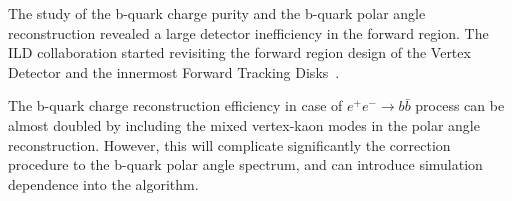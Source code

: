 The study of the b-quark charge purity and the b-quark polar angle reconstruction revealed a large detector inefficiency in the forward region. The ILD collaboration started revisiting the forward region design of the Vertex Detector and the innermost Forward Tracking Disks~\cite{bib:ILDNEW}. 

The b-quark charge reconstruction efficiency in case of $e^+e^-\to b\bar{b}$ process can be almost doubled by including the mixed vertex-kaon modes in the polar angle reconstruction. 
However, this will complicate significantly the correction procedure to the b-quark polar angle spectrum, and can introduce simulation dependence into the algorithm.
